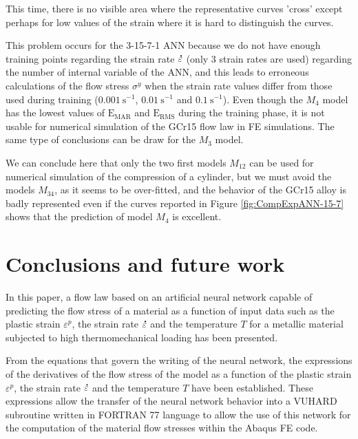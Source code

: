 \documentclass[algorithms,article,submit,pdftex,moreauthors]{Definitions/mdpi}
\DeclareRobustCommand{\mdot}[1]{\accentset{\mbox{\bfseries .}}{#1}}
\DeclareRobustCommand{\RMSE}{\text{E}_\text{RMS}}
\DeclareRobustCommand{\MARE}{\text{E}_\text{MAR}}
\DeclareRobustCommand{\ps}{\text{s}^{-1}}
\begin{document}
This time, there is no visible area where the representative curves 'cross' except perhaps for low values of the strain where it is hard to distinguish the curves.

This problem occurs for the 3-15-7-1 ANN because we do not have enough training points regarding the strain rate $\mdot\varepsilon$ (only 3 strain rates are used) regarding the number of internal variable of the ANN, and this leads to erroneous calculations of the flow stress $\sigma^y$ when the strain rate values differ from those used during training ($0.001~\ps$, $0.01~\ps$ and $0.1~\ps$).
Even though the $M_4$ model has the lowest values of $\MARE$ and $\RMSE$ during the training phase, it is not usable for numerical simulation of the GCr15 flow law in FE simulations. The same type of conclusions can be draw for the $M_3$ model.

We can conclude here that only the two first models $M_{12}$ can be used for numerical simulation of the compression of a cylinder, but we must avoid the models $M_{34}$, as it seems to be over-fitted, and the behavior of the GCr15 alloy is badly represented even if the curves reported in Figure \ref{fig:CompExpANN-15-7} shows that the prediction of model $M_4$ is excellent.

\section{Conclusions and future work}\label{sec:Conclusions}

In this paper, a flow law based on an artificial neural network capable of predicting the flow stress of a material as a function of input data such as the plastic strain $\varepsilon^p$, the strain rate $\mdot\varepsilon$ and the temperature $T$ for a metallic material subjected to high thermomechanical loading has been presented.

From the equations that govern the writing of the neural network, the expressions of the derivatives of the flow stress of the model as a function of the plastic strain $\varepsilon^p$, the strain rate $\mdot\varepsilon$ and the temperature $T$ have been established.
These expressions allow the transfer of the neural network behavior into a VUHARD subroutine written in FORTRAN 77 language to allow the use of this network for the computation of the material flow stresses within the Abaqus FE code.
\end{document}
